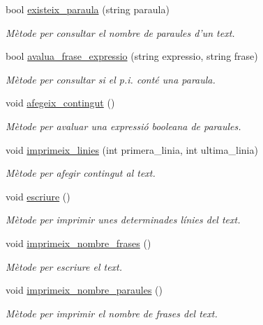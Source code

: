 \begin{DoxyCompactItemize}
bool \hyperlink{class_text_a2f935a61b802f79570fa352329acf8ff}{existeix\+\_\+paraula} (string paraula)
\begin{DoxyCompactList}\small\item\em Mètode per consultar el nombre de paraules d'un text. \end{DoxyCompactList}\item 
bool \hyperlink{class_text_a0ed26a599eeacb2eda891134f2d38ae8}{avalua\+\_\+frase\+\_\+expressio} (string expressio, string frase)
\begin{DoxyCompactList}\small\item\em Mètode per consultar si el p.\+i. conté una paraula. \end{DoxyCompactList}\item 
void \hyperlink{class_text_aea5ba5d02adc209b2ed4f948705dc60a}{afegeix\+\_\+contingut} ()
\begin{DoxyCompactList}\small\item\em Mètode per avaluar una expressió booleana de paraules. \end{DoxyCompactList}\item 
void \hyperlink{class_text_a9a686e90e9f8f8b2f8b53beaf097af78}{imprimeix\+\_\+linies} (int primera\+\_\+linia, int ultima\+\_\+linia)
\begin{DoxyCompactList}\small\item\em Mètode per afegir contingut al text. \end{DoxyCompactList}\item 
void \hyperlink{class_text_acde1aef4685230f91a9bf3c8af708a90}{escriure} ()
\begin{DoxyCompactList}\small\item\em Mètode per imprimir unes determinades línies del text. \end{DoxyCompactList}\item 
void \hyperlink{class_text_ad91853d8dc6df6e97a16f7180c49eda3}{imprimeix\+\_\+nombre\+\_\+frases} ()
\begin{DoxyCompactList}\small\item\em Mètode per escriure el text. \end{DoxyCompactList}\item 
void \hyperlink{class_text_a3da13d29c07e07416ac49384e43e0e9d}{imprimeix\+\_\+nombre\+\_\+paraules} ()
\begin{DoxyCompactList}\small\item\em Mètode per imprimir el nombre de frases del text. \end{DoxyCompactList}\item 

\end{DoxyCompactItemize}
